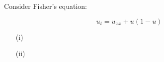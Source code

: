 Consider Fisher's equation:

$$u_t = u_{xx} + u(1 - u)$$

\begin{enumerate}

    \item[(i)] 
    \pagebreak
    \item[(ii)] 
 
  \end{enumerate}